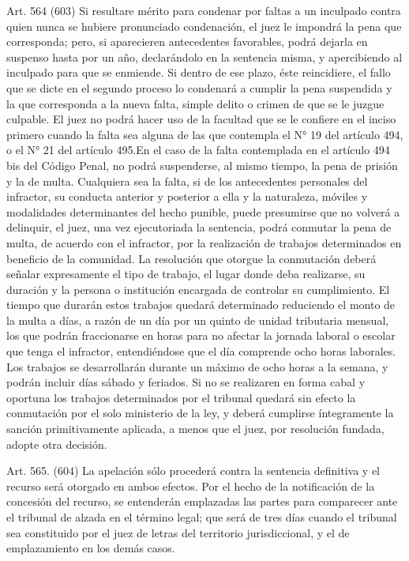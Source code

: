     Art. 564 (603) Si resultare mérito para condenar por faltas a un inculpado contra quien nunca se hubiere pronunciado condenación, el juez le impondrá la pena que corresponda; pero, si aparecieren antecedentes favorables, podrá dejarla en suspenso hasta por un año, declarándolo en la sentencia misma, y apercibiendo al inculpado para que se enmiende.
    Si dentro de ese plazo, éste reincidiere, el fallo que se dicte en el segundo proceso lo condenará a cumplir la pena suspendida y la que corresponda a la nueva falta, simple delito o crimen de que se le juzgue culpable.
    El juez no podrá hacer uso de la facultad que se le confiere en el inciso primero cuando la falta sea alguna de las que contempla el N° 19 del artículo 494, o el N° 21 del artículo 495.En el caso de la falta contemplada en el artículo 494 bis del Código Penal, no podrá suspenderse, al mismo tiempo, la pena de prisión y la de multa.
    Cualquiera sea la falta, si de los antecedentes personales del infractor, su conducta anterior y posterior a ella y la naturaleza, móviles y modalidades determinantes del hecho punible, puede presumirse que no volverá a delinquir, el juez, una vez ejecutoriada la sentencia, podrá conmutar la pena de multa, de acuerdo con el infractor, por la realización de trabajos determinados en beneficio de la comunidad.
    La resolución que otorgue la conmutación deberá señalar expresamente el tipo de trabajo, el lugar donde deba realizarse, su duración y la persona o institución encargada de controlar su cumplimiento.
    El tiempo que durarán estos trabajos quedará determinado reduciendo el monto de la multa a días, a razón de un día por un quinto de unidad tributaria mensual, los que podrán fraccionarse en horas para no afectar la jornada laboral o escolar que tenga el infractor, entendiéndose que el día comprende ocho horas laborales. Los trabajos se desarrollarán durante un máximo de ocho horas a la semana, y podrán incluir días sábado y feriados.
    Si no se realizaren en forma cabal y oportuna los trabajos determinados por el tribunal quedará sin efecto la conmutación por el solo ministerio de la ley, y deberá cumplirse íntegramente la sanción primitivamente aplicada, a menos que el juez, por resolución fundada, adopte otra decisión.



    Art. 565. (604) La apelación sólo procederá contra la sentencia definitiva y el recurso será otorgado en ambos efectos.
    Por el hecho de la notificación de la concesión del recurso, se entenderán emplazadas las partes para comparecer ante el tribunal de alzada en el término legal; que será de tres días cuando el tribunal sea constituido por el juez de letras del territorio jurisdiccional, y el de emplazamiento en los demás casos.

